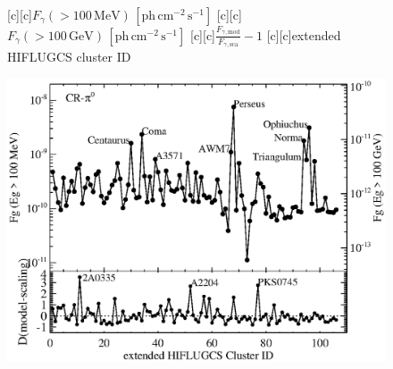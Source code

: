 \documentclass[dvips]{article}
\begin{document}
\pagestyle{empty}

\newcommand{\size}{\small}%
\newcommand{\sizee}{\large}

\begin{figure}
  [c][c]{\size $F_{\gamma}(>100\,\mathrm{MeV})\,[\mathrm{ph}\,\mathrm{cm}^{-2}\,\mathrm{s}^{-1}]$}
  [c][c]{\size $F_{\gamma}(>100\,\mathrm{GeV})\,[\mathrm{ph}\,\mathrm{cm}^{-2}\,\mathrm{s}^{-1}]$}
 [c][c]{\sizee $\frac{F_{\gamma,\mathrm{mod}}}{F_{\gamma,\mathrm{sca}}}-1$}
  [c][c]{{\size extended HIFLUGCS cluster ID}}

    \includegraphics[width=\textwidth]{Flux.comp.CR_raw.eps}
\end{figure}
\end{document}

